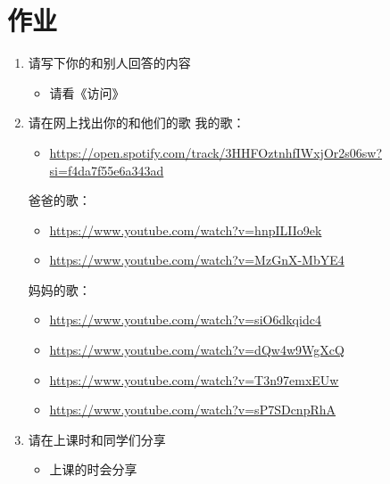 \documentclass[11pt]{article}
\begin{document}
\section{作业}
\label{sec:org596f0e8}
\begin{enumerate}
\item 请写下你的和别人回答的内容
\begin{itemize}
\item 请看《访问》
\end{itemize}
\item 请在网上找出你的和他们的歌
我的歌：
\begin{itemize}
\item \url{https://open.spotify.com/track/3HHFOztnhfIWxjOr2s06sw?si=f4da7f55e6a343ad}
\end{itemize}
爸爸的歌：
\begin{itemize}
\item \url{https://www.youtube.com/watch?v=hnpILIIo9ek}
\item \url{https://www.youtube.com/watch?v=MzGnX-MbYE4}
\end{itemize}
妈妈的歌：
\begin{itemize}
\item \url{https://www.youtube.com/watch?v=siO6dkqidc4}
\item \url{https://www.youtube.com/watch?v=dQw4w9WgXcQ}
\item \url{https://www.youtube.com/watch?v=T3n97emxEUw}
\item \url{https://www.youtube.com/watch?v=sP7SDcnpRhA}
\end{itemize}
\item 请在上课时和同学们分享
\begin{itemize}
\item 上课的时会分享
\end{itemize}
\end{enumerate}
\end{document}
